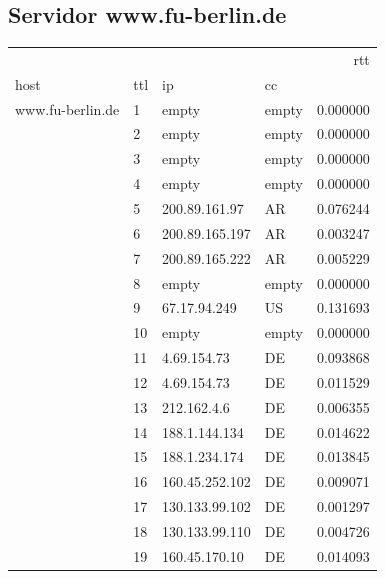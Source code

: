 \subsection{Servidor www.fu-berlin.de}
\begin{center}
\begin{tabular}{llllr}
\toprule
                 &    &                &    &       rtt \\
host & ttl & ip & cc &           \\
\midrule
www.fu-berlin.de & 1  & empty & empty &  0.000000 \\
                 & 2  & empty & empty &  0.000000 \\
                 & 3  & empty & empty &  0.000000 \\
                 & 4  & empty & empty &  0.000000 \\
                 & 5  & 200.89.161.97 & AR &  0.076244 \\
                 & 6  & 200.89.165.197 & AR &  0.003247 \\
                 & 7  & 200.89.165.222 & AR &  0.005229 \\
                 & 8  & empty & empty &  0.000000 \\
                 & 9  & 67.17.94.249 & US &  0.131693 \\
                 & 10 & empty & empty &  0.000000 \\
                 & 11 & 4.69.154.73 & DE &  0.093868 \\
                 & 12 & 4.69.154.73 & DE &  0.011529 \\
                 & 13 & 212.162.4.6 & DE &  0.006355 \\
                 & 14 & 188.1.144.134 & DE &  0.014622 \\
                 & 15 & 188.1.234.174 & DE &  0.013845 \\
                 & 16 & 160.45.252.102 & DE &  0.009071 \\
                 & 17 & 130.133.99.102 & DE &  0.001297 \\
                 & 18 & 130.133.99.110 & DE&  0.004726 \\
                 & 19 & 160.45.170.10 & DE &  0.014093 \\
\bottomrule
\end{tabular}

\end{center}


